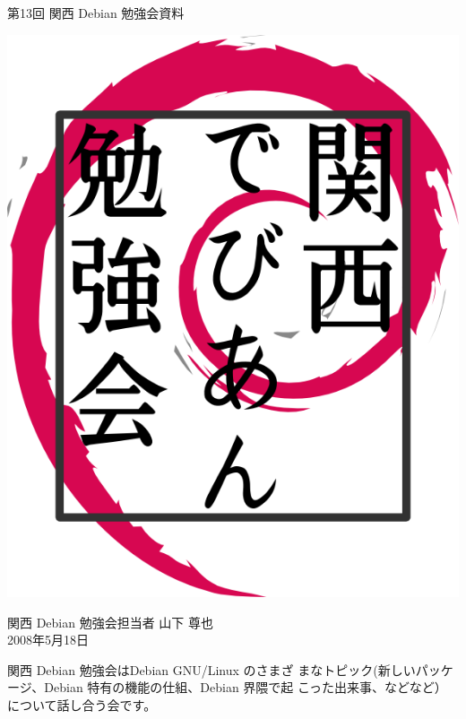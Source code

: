 \documentclass[mingoth,a4paper]{jsarticle}
\newcommand{\debmtgyear}{2008}
\newcommand{\debmtgdate}{18}
\newcommand{\debmtgmonth}{5}
\newcommand{\debmtgnumber}{13}
\begin{document}
\begin{titlepage}


 第\debmtgnumber{}回 関西 Debian 勉強会資料

\vspace{2cm}

\begin{center}
\includegraphics{image200802/kansaidebianlogo.png}
\end{center}

\begin{flushright}
\hfill{}関西 Debian 勉強会担当者 山下 尊也\\
\hfill{}\debmtgyear{}年\debmtgmonth{}月\debmtgdate{}日
\end{flushright}

\thispagestyle{empty}
\end{titlepage}

 
 関西 Debian 勉強会はDebian GNU/Linux のさまざ
 まなトピック(新しいパッケージ、Debian 特有の機能の仕組、Debian 界隈で起
 こった出来事、などなど）について話し合う会です。
\end{document}
